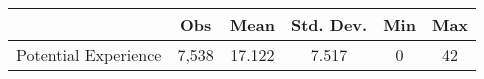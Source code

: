 {
\def\sym#1{\ifmmode^{#1}\else\(^{#1}\)\fi}
\begin{tabular}{l*{1}{ccccc}}
\hline\hline
          &      Obs&     Mean&Std. Dev.&      Min&      Max\\
\hline
Potential Experience&    7,538&   17.122&    7.517&        0&       42\\
\hline\hline
\end{tabular}
}
